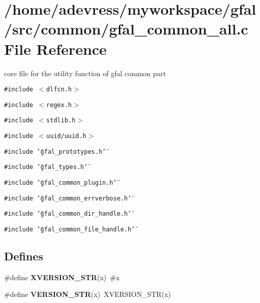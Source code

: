 \section{/home/adevress/myworkspace/gfal/src/common/gfal\_\-common\_\-all.c File Reference}
\label{gfal__common__all_8c}
core file for the utility function of gfal common part 

{\tt \#include $<$dlfcn.h$>$}\par
{\tt \#include $<$regex.h$>$}\par
{\tt \#include $<$stdlib.h$>$}\par
{\tt \#include $<$uuid/uuid.h$>$}\par
{\tt \#include \char`\"{}gfal\_\-prototypes.h\char`\"{}}\par
{\tt \#include \char`\"{}gfal\_\-types.h\char`\"{}}\par
{\tt \#include \char`\"{}gfal\_\-common\_\-plugin.h\char`\"{}}\par
{\tt \#include \char`\"{}gfal\_\-common\_\-errverbose.h\char`\"{}}\par
{\tt \#include \char`\"{}gfal\_\-common\_\-dir\_\-handle.h\char`\"{}}\par
{\tt \#include \char`\"{}gfal\_\-common\_\-file\_\-handle.h\char`\"{}}\par
\subsection*{Defines}
\begin{CompactItemize}
\item 
\#define \textbf{XVERSION\_\-STR}(x)~\#x\label{gfal__common__all_8c_09fc3dfb86b46f489c9bf89b784a285a}

\item 
\#define \textbf{VERSION\_\-STR}(x)~XVERSION\_\-STR(x)\label{gfal__common__all_8c_86cff2cb94b4b7cbf259ff9859c0dc50}

\end{CompactItemize}

